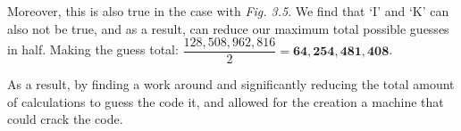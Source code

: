 \documentclass[11pt]{article}
\newcommand\tab[1][0.5cm]{\hspace*{#1}}
\begin{document}
\tab Moreover, this is also true in the case with \textit{Fig. 3.5}. We find that `I' and `K' can also not be true, and as a result, can reduce our maximum total possible guesses in half. Making the guess total: $\dfrac{128,508,962,816}{2}=\bm{64,254,481,408}$.

\tab As a result, by finding a work around and significantly reducing the total amount of calculations to guess the code it, and allowed for the creation a machine that could crack the code.  
\end{document}
